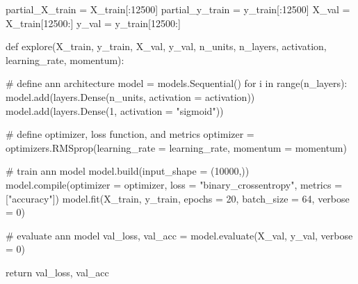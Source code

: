 \documentclass[
  letterpaper,
  DIV=11,
  numbers=noendperiod]{scrreprt}
\newenvironment{Shaded}{\begin{snugshade}}{\end{snugshade}}
\newcommand{\BuiltInTok}[1]{\textcolor[rgb]{0.00,0.23,0.31}{#1}}
\newcommand{\CommentTok}[1]{\textcolor[rgb]{0.37,0.37,0.37}{#1}}
\newcommand{\ControlFlowTok}[1]{\textcolor[rgb]{0.00,0.23,0.31}{#1}}
\newcommand{\DecValTok}[1]{\textcolor[rgb]{0.68,0.00,0.00}{#1}}
\newcommand{\KeywordTok}[1]{\textcolor[rgb]{0.00,0.23,0.31}{#1}}
\newcommand{\NormalTok}[1]{\textcolor[rgb]{0.00,0.23,0.31}{#1}}
\newcommand{\OperatorTok}[1]{\textcolor[rgb]{0.37,0.37,0.37}{#1}}
\newcommand{\StringTok}[1]{\textcolor[rgb]{0.13,0.47,0.30}{#1}}
\begin{document}
\begin{Shaded}
\begin{Highlighting}[]
\NormalTok{partial\_X\_train }\OperatorTok{=}\NormalTok{ X\_train[:}\DecValTok{12500}\NormalTok{]}
\NormalTok{partial\_y\_train }\OperatorTok{=}\NormalTok{ y\_train[:}\DecValTok{12500}\NormalTok{]}
\NormalTok{X\_val }\OperatorTok{=}\NormalTok{ X\_train[}\DecValTok{12500}\NormalTok{:]}
\NormalTok{y\_val }\OperatorTok{=}\NormalTok{ y\_train[}\DecValTok{12500}\NormalTok{:]}
\end{Highlighting}
\end{Shaded}

\begin{Shaded}
\begin{Highlighting}[]
\KeywordTok{def}\NormalTok{ explore(X\_train, }
\NormalTok{            y\_train,}
\NormalTok{            X\_val,}
\NormalTok{            y\_val,}
\NormalTok{            n\_units,}
\NormalTok{            n\_layers,}
\NormalTok{            activation,}
\NormalTok{            learning\_rate,}
\NormalTok{            momentum):}
    
    \CommentTok{\# define ann architecture}
\NormalTok{    model }\OperatorTok{=}\NormalTok{ models.Sequential()}
    \ControlFlowTok{for}\NormalTok{ i }\KeywordTok{in} \BuiltInTok{range}\NormalTok{(n\_layers):}
\NormalTok{        model.add(layers.Dense(n\_units, activation }\OperatorTok{=}\NormalTok{ activation))}
\NormalTok{    model.add(layers.Dense(}\DecValTok{1}\NormalTok{, activation }\OperatorTok{=} \StringTok{"sigmoid"}\NormalTok{))}

    \CommentTok{\# define optimizer, loss function, and metrics}
\NormalTok{    optimizer }\OperatorTok{=}\NormalTok{ optimizers.RMSprop(learning\_rate }\OperatorTok{=}\NormalTok{ learning\_rate, momentum }\OperatorTok{=}\NormalTok{ momentum)}


    \CommentTok{\# train ann model}
\NormalTok{    model.build(input\_shape }\OperatorTok{=}\NormalTok{ (}\DecValTok{10000}\NormalTok{,))}
\NormalTok{    model.}\BuiltInTok{compile}\NormalTok{(optimizer }\OperatorTok{=}\NormalTok{ optimizer, loss }\OperatorTok{=} \StringTok{"binary\_crossentropy"}\NormalTok{, metrics }\OperatorTok{=}\NormalTok{ [}\StringTok{"accuracy"}\NormalTok{])}
\NormalTok{    model.fit(X\_train, y\_train, epochs }\OperatorTok{=} \DecValTok{20}\NormalTok{, batch\_size }\OperatorTok{=} \DecValTok{64}\NormalTok{, verbose }\OperatorTok{=} \DecValTok{0}\NormalTok{)}

    \CommentTok{\# evaluate ann model}
\NormalTok{    val\_loss, val\_acc }\OperatorTok{=}\NormalTok{ model.evaluate(X\_val, y\_val, verbose }\OperatorTok{=} \DecValTok{0}\NormalTok{)}

    \ControlFlowTok{return}\NormalTok{ val\_loss, val\_acc}
\end{Highlighting}
\end{Shaded}
\end{document}
